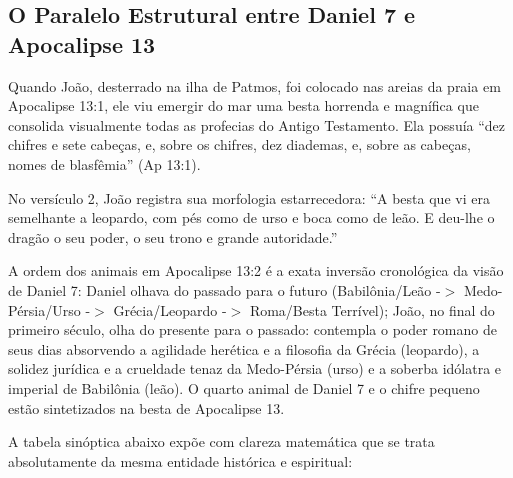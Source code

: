 \documentclass[11pt,a4paper,openany]{book}
\begin{document}
\subsection{O Paralelo Estrutural entre Daniel 7 e Apocalipse 13}


Quando João, desterrado na ilha de Patmos, foi colocado nas areias da praia em Apocalipse 13:1, ele viu emergir do mar uma besta horrenda e magnífica que consolida visualmente todas as profecias do Antigo Testamento. Ela possuía ``dez chifres e sete cabeças, e, sobre os chifres, dez diademas, e, sobre as cabeças, nomes de blasfêmia'' (Ap 13:1).

No versículo 2, João registra sua morfologia estarrecedora: ``A besta que vi era semelhante a leopardo, com pés como de urso e boca como de leão. E deu-lhe o dragão o seu poder, o seu trono e grande autoridade.''

A ordem dos animais em Apocalipse 13:2 é a exata inversão cronológica da visão de Daniel 7: Daniel olhava do passado para o futuro (Babilônia/Leão -$>$ Medo-Pérsia/Urso -$>$ Grécia/Leopardo -$>$ Roma/Besta Terrível); João, no final do primeiro século, olha do presente para o passado: contempla o poder romano de seus dias absorvendo a agilidade herética e a filosofia da Grécia (leopardo), a solidez jurídica e a crueldade tenaz da Medo-Pérsia (urso) e a soberba idólatra e imperial de Babilônia (leão). O quarto animal de Daniel 7 e o chifre pequeno estão sintetizados na besta de Apocalipse 13.

A tabela sinóptica abaixo expõe com clareza matemática que se trata absolutamente da mesma entidade histórica e espiritual:
\end{document}
